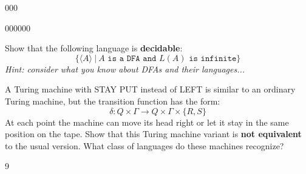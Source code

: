 \documentclass[12pt]{article}
\newenvironment{exercise}[2][Exercise]{\begin{trivlist}
\item[\hskip \labelsep {\bfseries #1}\hskip \labelsep {\bfseries #2.}]}{\end{trivlist}}
\newenvironment{solution}[1][{\color{red} Solution:}]{\begin{trivlist}
\item[\hskip \labelsep {\bfseries #1}\hskip \labelsep {\bfseries}]}{\end{trivlist}}
\begin{document}
\begin{exercise}{3}
\begin{enumerate}[(a)]
	\item 000
	\begin{solution}
	\end{solution}
	
	\item 000000
	\begin{solution}
	\end{solution}
	
\end{enumerate}
\end{exercise}
\clearpage

\begin{exercise}{4}
Show that the following language is \textbf{decidable}:
\[\{\langle A \rangle \ | \ A \texttt{ is a DFA and } L(A) \texttt{ is infinite}\}\]
\textit{Hint: consider what you know about DFAs and their languages...}
\begin{solution}
\end{solution}

\end{exercise}

\clearpage

\begin{exercise}{5 \textbf{OPTIONAL}}
A Turing machine with STAY PUT instead of LEFT  is similar to an ordinary Turing machine, but the transition function has the form:
\[\delta:Q\times\Gamma \rightarrow Q \times \Gamma \times \{R,S\}\]
At each point the machine can move its head right or let it stay in the same position on the tape. Show that this Turing machine variant is \textbf{not equivalent} to the usual version. What class of languages do these machines recognize?
\end{exercise}

\begin{solution}
\end{solution}

\vfill
\begin{thebibliography}{9}
 
\end{thebibliography}

 
\end{document}
